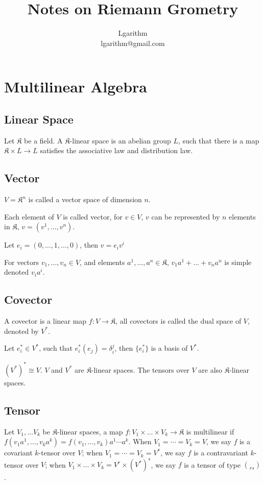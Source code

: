 \documentclass{article}
\title{Notes on Riemann Grometry}
\author{Lgarithm\\\mbox{lgarithm@gmail.com}}
\begin{document}

\section{Multilinear Algebra}

\subsection{Linear Space}
Let $\mathfrak K$ be a field.
A $\mathfrak K$-linear space is an abelian group $L$,
such that there is a map $\mathfrak K \times L \to L$
satisfies the associative law and distribution law.

\subsection{Vector}
$V = \mathfrak K^n$ is called a vector space of dimension $n$.

Each element of $V$ is called vector, for $v \in V$, $v$ can be
represented by $n$ elements in $\mathfrak K$, $v = (v^1, \dots, v^n)$.

Let $e_i = (0, \dots, 1, \dots, 0)$,
then $v = e_iv^i$

For vectors $v_1, \dots, v_n \in V$, and elements $a^1, \dots, a^n \in \mathfrak K$,
$v_1a^1 + \dots + v_na^n$ is simple denoted $v_ia^i$.

\subsection{Covector}
A covector is a linear map $f : V \to \mathfrak K$, all covectors is called the dual space of $V$, denoted by $V^\ast$.

Let $e_i^\ast \in V^\ast$, such that $e_i^\ast(e_j) = \delta_i^j$, then $\{e_i^\ast\}$ is a basis of $V^\ast$.

$(V^\ast)^\ast \cong V$.
$V$ and $V^\ast$ are $\mathfrak K$-linear spaces.
The tensors over $V$ are also $\mathfrak K$-linear spaces.


\subsection{Tensor}
Let $V_1, \dots V_k$ be $\mathfrak K$-linear spaces,
a map $f : V_1 \times \dots \times V_k \to \mathfrak K$ is
multilinear if $f(v_1a^1, \dots, v_ka^k) = f(v_1, \dots, v_k)a^1\cdots a^k$.
When $V_1 = \cdots = V_k = V$, we say $f$ is a covariant $k$-tensor over $V$;
when $V_1 = \cdots = V_k = V^\ast$, we say $f$ is a contravariant $k$-tensor over $V$;
when $V_1 \times \dots \times V_k = V^r \times (V^\ast)^s$,
we say $f$ is a tensor of type $\choose{r s}$.
\end{document}
